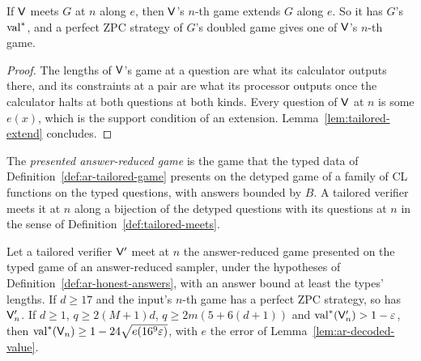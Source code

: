 \begin{lemma}
\label{lem:tailored-meets}
\leanok
If $\mathsf{V}$ meets $G$ at $n$ along $e$, then $\mathsf{V}$'s $n$-th game extends $G$ along $e$.
So it has $G$'s $\mathrm{val}^*$, and a perfect ZPC strategy of $G$'s doubled game gives one of
$\mathsf{V}$'s $n$-th game.
\end{lemma}

\begin{proof}
\leanok
The lengths of $\mathsf{V}$'s game at a question are what its calculator outputs there, and its
constraints at a pair are what its processor outputs once the calculator halts at both questions
at both kinds. Every question of $\mathsf{V}$ at $n$ is some $e(x)$, which is the support condition
of an extension. Lemma~\ref{lem:tailored-extend} concludes.
\end{proof}

\begin{definition}
\label{def:ar-meets}
\leanok
The \emph{presented answer-reduced game} is the game that the typed data of
Definition~\ref{def:ar-tailored-game} presents on the detyped game of a family of CL functions on
the typed questions, with answers bounded by $B$. A tailored verifier meets it at $n$ along a
bijection of the detyped questions with its questions at $n$ in the sense of
Definition~\ref{def:tailored-meets}.
\end{definition}

\begin{theorem}
\label{thm:ar-meets}
\leanok
Let a tailored verifier $\mathsf{V}'$ meet at $n$ the answer-reduced game presented on the typed
game of an answer-reduced sampler, under the hypotheses of Definition~\ref{def:ar-honest-answers},
with an answer bound at least the types' lengths. If $d \geq 17$ and the input's $n$-th game has a
perfect ZPC strategy, so has $\mathsf{V}'_n$. If $d \geq 1$, $q \geq 2 (M + 1) d$,
$q \geq 2 m (5 + 6 (d + 1))$ and $\mathrm{val}^*(\mathsf{V}'_n) > 1 - \varepsilon$, then
$\mathrm{val}^*(\mathsf{V}_n) \geq 1 - 24 \sqrt{e(16^9 \varepsilon)}$, with $e$ the error of
Lemma~\ref{lem:ar-decoded-value}.
\end{theorem}

